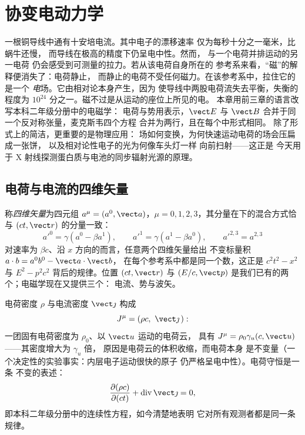 \chapter{协变电动力学}\label{ch:b3:covariant-electromagnetism}

一根铜导线中通有十安培电流。其中电子的漂移速率
仅为每秒十分之一毫米，比蜗牛还慢，
而导线在极高的精度下仍呈电中性。然而，
与一个电荷并排运动的另一电荷
仍会感受到可测量的拉力。若从该电荷自身所在的
参考系来看，“磁”的解释便消失了：电荷静止，
而静止的电荷不受任何磁力。在该参考系中，拉住它的是一个
\emph{电}场。它由相对论本身产生，因为
使导线中两股电荷流失去平衡，失衡的程度为
$10^{24}$ 分之一。磁不过是从运动的座位上所见的电。
本章用前三章的语言改写本科二年级分册中的电磁学：
电荷与势用表示，$\vect E$ 与 $\vect B$
合并于同一个反对称张量，麦克斯韦四个方程
合并为两行，且在每个中形式相同。
除了形式上的简洁，更重要的是物理应用：
场如何变换，为何快速运动电荷的场会压扁成一张饼，
以及相对论性电子的光为何像车头灯一样
向前扫射——这正是
今天用于 X 射线探测蛋白质与电池的同步辐射光源的原理。

\section{电荷与电流的四维矢量}

\begin{definition}[四维矢量]\label{def:b3:covariant-electromagnetism:fourvector}
称\emph{四维矢量}为四元组 $a^\mu = (a^0, \vect a)$，$\mu =
0, 1, 2, 3$，其分量在下的混合方式恰与 $(ct,
\vect r)$ 的分量一致：
\[
a'^0 = \gamma(a^0 - \beta a^1) , \qquad
a'^1 = \gamma(a^1 - \beta a^0) , \qquad
a'^{2,3} = a^{2,3}
\]
对速率为 $\beta c$、沿 $x$ 方向的而言，任意两个四维矢量给出
不变标量积 $a\cdot b = a^0b^0 - \vect a\cdot\vect b$，
在每个参考系中都是同一个数，这正是 $c^2t^2 - x^2$
与 $E^2 - p^2c^2$ 背后的规律。位置 $(ct, \vect r)$ 与
$(E/c, \vect p)$ 是我们已有的两个；电磁学现在又提供三个：
电流、势与波矢。
\end{definition}

\begin{proposition}[四维电流与电荷守恒]\label{prop:b3:covariant-electromagnetism:fourcurrent}
电荷密度 $\rho$ 与电流密度 $\vect\jmath$
构成
\[
J^\mu = (\rho c,\ \vect\jmath\,) :
\]
一团固有电荷密度为 $\rho_0$、以 $\vect u$ 运动的电荷云，
具有 $J^\mu = \rho_0\gamma_u(c, \vect u)$——其密度增大为 $\gamma_u$ 倍，
原因是电荷云的体积收缩，而电荷本身
是不变量（一个决定性的实验事实：内层电子运动很快的原子
仍严格呈电中性）。电荷守恒是一条
不变的表述：
\[
\frac{\partial(\rho c)}{\partial(ct)} +
\operatorname{div}\vect\jmath = 0 ,
\]
即本科二年级分册中的连续性方程，如今清楚地表明
它对所有观测者都是同一条规律。
\end{proposition}

